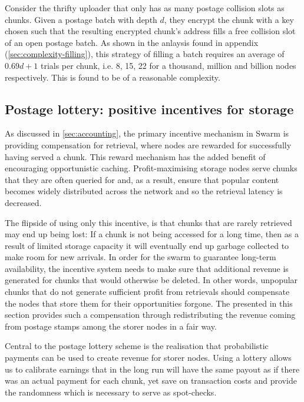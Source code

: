 Consider the thrifty uploader that only has as many postage collision slots as chunks. Given a postage batch with depth $d$, they encrypt the chunk with a key chosen such that the resulting encrypted chunk's address fills a free collision slot of an open postage batch. As shown in the anlaysis found in appendix  (\ref{sec:complexity-filling}), this strategy of filling a batch requires an average of $0.69d+1$ trials per chunk, i.e. 8, 15, 22 for a thousand, million and billion nodes respectively. This is found to be of a reasonable complexity.


\subsection{Postage lottery: positive incentives for storage \statusyellow}\label{sec:postage-lottery}

\yellow{}

As discussed in \ref{sec:accounting}, the primary incentive mechanism in Swarm is providing compensation for retrieval, where nodes are rewarded for successfully having served a chunk. This reward mechanism has the added benefit of encouraging opportunistic caching. Profit-maximising storage nodes serve chunks that they are often queried for and, as a result, ensure that popular content becomes widely distributed across the network and so the retrieval latency is decreased.

The flipside of using only this incentive, is that chunks that are rarely retrieved may end up being lost: If a chunk is not being accessed for a long time, then as a result of limited storage capacity it will eventually end up garbage collected to make room for new arrivals. In order for the swarm to guarantee long-term availability, the incentive system needs to make sure that additional revenue is generated for chunks that would otherwise be deleted. In other words, unpopular chunks that do not generate sufficient profit from retrievals should compensate the nodes that store them for their opportunities forgone. The  presented in this section provides such a compensation through redistributing the revenue coming from postage stamps among the storer nodes in a fair way.



Central to the postage lottery scheme is the realisation that probabilistic payments can be used to create revenue for storer nodes.
Using a lottery allows us to calibrate earnings that in the long run will have the same payout as if there was an actual payment for each chunk, yet save on transaction costs and provide the randomness which is necessary to serve as spot-checks.


